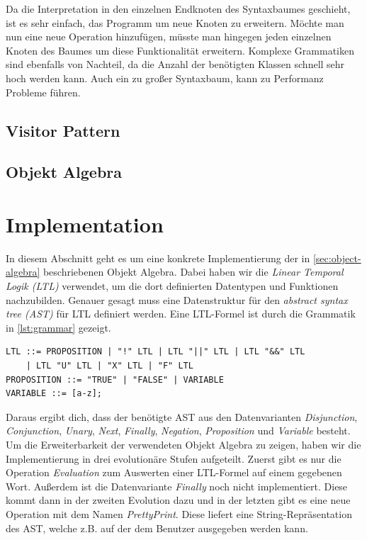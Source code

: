 \documentclass{llncs}
\begin{document}
Da die Interpretation in den einzelnen Endknoten des Syntaxbaumes geschieht, ist es sehr einfach, das Programm um neue Knoten zu erweitern. Möchte man nun eine neue Operation hinzufügen, müsste man hingegen jeden einzelnen Knoten des Baumes um diese Funktionalität erweitern. Komplexe Grammatiken sind ebenfalls von Nachteil, da die Anzahl der benötigten Klassen schnell sehr hoch werden kann. Auch ein zu großer Syntaxbaum, kann zu Performanz Probleme führen. 

\subsection{Visitor Pattern} \label{sec:visitor}

\subsection{Objekt Algebra} \label{sec:object-algebra}

\section{Implementation} \label{sec:implementation}
In diesem Abschnitt geht es um eine konkrete Implementierung der in \autoref{sec:object-algebra} beschriebenen Objekt Algebra.
Dabei haben wir die \emph{Linear Temporal Logik (LTL)} \cite{pnueli77} verwendet, um die dort definierten Datentypen und Funktionen nachzubilden.
Genauer gesagt muss eine Datenstruktur für den \emph{abstract syntax tree (AST)} für LTL definiert werden.
Eine LTL-Formel ist durch die Grammatik in \autoref{lst:grammar} gezeigt.

\begin{lstlisting}
LTL ::= PROPOSITION | "!" LTL | LTL "||" LTL | LTL "&&" LTL
	| LTL "U" LTL | "X" LTL | "F" LTL
PROPOSITION ::= "TRUE" | "FALSE" | VARIABLE
VARIABLE ::= [a-z];
\end{lstlisting}\label{lst:grammar}

Daraus ergibt dich, dass der benötigte AST aus den Datenvarianten \emph{Disjunction}, \emph{Conjunction}, \emph{Unary}, \emph{Next}, \emph{Finally}, \emph{Negation}, \emph{Proposition} und \emph{Variable} besteht.
Um die Erweiterbarkeit der verwendeten Objekt Algebra zu zeigen, haben wir die Implementierung in drei evolutionäre Stufen aufgeteilt.
Zuerst gibt es nur die Operation \emph{Evaluation} zum Auswerten einer LTL-Formel auf einem gegebenen Wort. Außerdem ist die Datenvariante \emph{Finally} noch nicht implementiert.
Diese kommt dann in der zweiten Evolution dazu und in der letzten gibt es eine neue Operation mit dem Namen \emph{PrettyPrint}.
Diese liefert eine String-Repräsentation des AST, welche z.B. auf der dem Benutzer ausgegeben werden kann.
\end{document}
